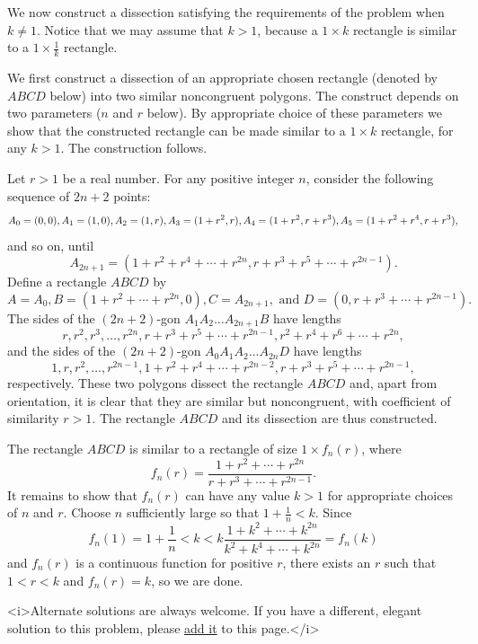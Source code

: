 \begin{enumerate}
 We now construct a dissection satisfying the requirements of the problem when $k\neq 1$. Notice that we may assume that $k > 1$, because a $1\times k$ rectangle is similar to a $1\times\frac{1}{k}$ rectangle.

 We first construct a dissection of an appropriate chosen rectangle (denoted by $ABCD$ below) into two similar noncongruent polygons. The construct depends on two parameters ($n$ and $r$ below). By appropriate choice of these parameters we show that the constructed rectangle can be made similar to a $1\times k$ rectangle, for any $k > 1$. The construction follows.

 Let $r > 1$ be a real number. For any positive integer $n$, consider the following sequence of $2n + 2$ points:
 \[A_0 = (0,0), A_1 = (1,0), A_2 = (1,r), A_3 = (1 + r^2, r), \\ A_4 = (1 + r^2, r + r^3), A_5 = (1 + r^2 + r^4, r + r^3),\]and so on, until
 \[A_{2n+1} = (1 + r^2 + r^4 + \cdots + r^{2n}, r + r^3 + r^5 + \cdots + r^{2n - 1}).\]Define a rectangle $ABCD$ by
 \[A = A_0, B = (1 + r^2 + \cdots + r^{2n}, 0), C = A_{2n + 1}, \text{ and }D = (0, r + r^3 + \cdots + r^{2n - 1}).\]The sides of the $(2n+2)$-gon $A_1A_2\ldots A_{2n+1}B$ have lengths
 \[r, r^2, r^3, \ldots, r^{2n}, r + r^3 + r^5 + \cdots + r^{2n-1}, r^2 + r^4 + r^6 + \cdots + r^{2n},\]and the sides of the $(2n+2)$-gon $A_0A_1A_2\ldots A_{2n}D$ have lengths
 \[1, r, r^2, \ldots, r^{2n-1}, 1 + r^2 + r^4 + \cdots + r^{2n-2}, r + r^3 + r^5 + \cdots + r^{2n-1},\]respectively. These two polygons dissect the rectangle $ABCD$ and, apart from orientation, it is clear that they are similar but noncongruent, with coefficient of similarity $r > 1$. The rectangle $ABCD$ and its dissection are thus constructed.

 The rectangle $ABCD$ is similar to a rectangle of size $1\times f_n(r)$, where
 \[f_n(r) = \frac{1 + r^2 + \cdots + r^{2n}}{r + r^3 + \cdots + r^{2n-1}}.\]It remains to show that $f_n(r)$ can have any value $k > 1$ for appropriate choices of $n$ and $r$. Choose $n$ sufficiently large so that $1 + \frac{1}{n} < k$. Since
 \[f_n(1) = 1 + \frac{1}{n} < k < k\frac{1 + k^2 + \cdots + k^{2n}}{k^2 + k^4 + \cdots + k^{2n}} = f_n(k)\]and $f_n(r)$ is a continuous function for positive $r$, there exists an $r$ such that $1 < r < k$ and $f_n(r) = k$, so we are done.

 <i>Alternate solutions are always welcome. If you have a different, elegant solution to this problem, please \href{https://artofproblemsolving.com/wiki/index.php?title=2004\_USAMO\_Problems/Problem\_3&action=edit}{add it} to this page.</i>


\end{enumerate}
